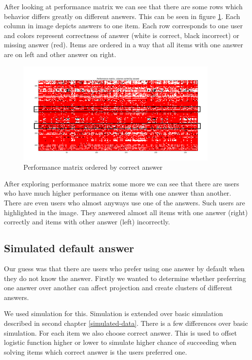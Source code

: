 \documentclass[
  digital, %
  table,   %
  nolof,     %
  nolot,     %
  nocover
]{fithesis3}
\begin{document}
After looking at performance matrix we can see that there are some rows which behavior differs greatly on different answers. This can be seen in figure \ref{fig:performance_matrix}. Each column in image depicts answers to one item. Each row corresponds to one user and colors represent correctness of answer (white is correct, black incorrect) or missing answer (red). Items are ordered in a way that all items with one answer are on left and other answer on right.

\begin{figure}
  \includegraphics[width=10cm]{img/performance_matrix}
  \caption{Performance matrix ordered by correct answer}
  \label{fig:performance_matrix}
\end{figure}

After exploring performance matrix some more we can see that there are users who have much higher performance on items with one answer than another. There are even users who almost anyways use one of the answers. Such users are highlighted in the image. They answered almost all items with one answer (right) correctly and items with other answer (left) incorrectly.


\subsection{Simulated default answer}

Our guess was that there are users who prefer using one answer by default when they do not know the answer. Firstly we wanted to determine whether preferring one answer over another can affect projection and create clusters of different answers.

We used simulation for this. Simulation is extended over basic simulation described in second chapter \ref{simulated-data}. There is a few differences over basic simulation. For each item we also choose correct answer. This is used to offset logistic function higher or lower to simulate higher chance of succeeding when solving items which correct answer is the users preferred one.
\end{document}
